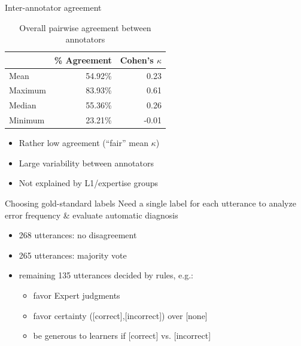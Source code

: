 \documentclass[xcolor={dvipsnames}]{beamer}
\begin{document}
		\begin{frame}{Inter-annotator agreement}
		\begin{table}%
			\centering
			\caption{Overall pairwise agreement between annotators}
			\begin{tabular}{lrr}
			\toprule
				&	\% Agreement	&	Cohen's $\kappa$	\\
			\midrule
Mean		&	54.92\%	&	0.23	\\
Maximum	&	83.93\%	&	0.61	\\
Median		&	55.36\%	&	0.26	\\
Minimum	&	23.21\%	&	-0.01	\\
			\bottomrule
			\end{tabular}			
			\label{tab:agreement:overall}
		\end{table}
		
		\begin{itemize}
		\item{Rather low agreement (``fair'' mean $\kappa$)}
		\item{Large variability between annotators}
		\item{Not explained by L1/expertise groups}
		\end{itemize}
		\end{frame}	
		
		\begin{frame}{Choosing gold-standard labels}
		Need a single label for each utterance to analyze error frequency \& evaluate automatic diagnosis		
		\begin{itemize}
		\item 268 utterances: no disagreement 
		\item 265 utterances: majority vote
		\item remaining 135 utterances decided by rules, e.g.: 
			\begin{itemize}
			\item favor Expert judgments
			\item favor certainty ([correct],[incorrect]) over [none]
			\item be generous to learners if [correct] vs. [incorrect]
			\end{itemize}
		\end{itemize}
		\end{frame}
		
\end{document}
